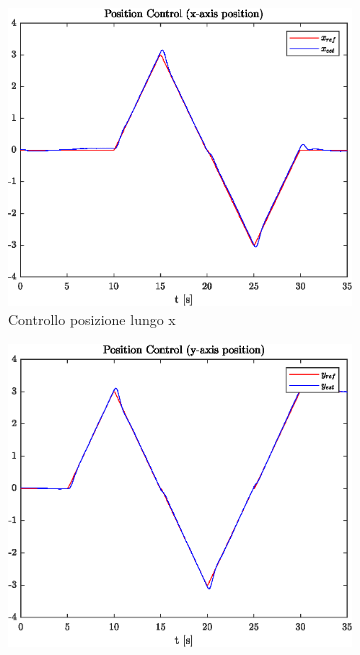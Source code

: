 \begin{figure}
	\centering
	\begin{subfigure}{0.45\textwidth}
		\centering
		\includegraphics[width=1\textwidth]{Simulazioni/Figure/SMC/SQUARE/PositionControlXPos}
		\caption{Controllo posizione lungo x}
	\end{subfigure}
	\hfill
	\begin{subfigure}{0.45\textwidth}
		\centering
		\includegraphics[width=1\textwidth]{Simulazioni/Figure/SMC/SQUARE/PositionControlYPos}

\end{subfigure}
\end{figure}
